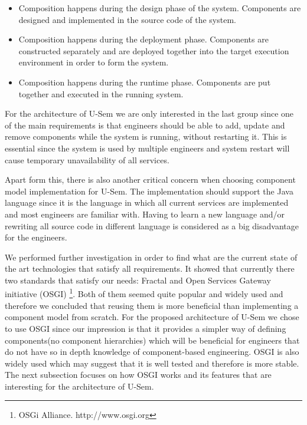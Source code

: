 \begin{itemize}
	\item  Composition happens during the design phase of the system. Components are designed and implemented in the source code of the system.
	\item  Composition happens during the deployment phase. Components are constructed separately and are deployed together into the target execution environment in order to form the system.
	\item Composition happens during the runtime phase. Components are put together and executed in the running system.
\end{itemize}

For the architecture of U-Sem we are only interested in the last group since one of the main requirements is that engineers should be able to add, update and remove components while the system is running, without restarting it. This is essential since the system is used by multiple engineers and system restart will cause temporary unavailability of all services. 

Apart form this, there is also another critical concern when choosing component model implementation for U-Sem. The implementation should support the Java language since it is the language in which all current services are implemented and most engineers are familiar with. Having to learn a new language and/or rewriting all source code in different language is considered as a big disadvantage for the engineers.

We performed further investigation in order to find what are the current state of the art technologies that satisfy all requirements. It showed that currently there two standards that satisfy our needs: Fractal \cite{bruneton2006fractal} and Open Services Gateway initiative (OSGI) \footnote{OSGi Alliance. http://www.osgi.org}. Both of them seemed quite popular and widely used and therefore we concluded that reusing them is more beneficial than implementing a component model from scratch. For the proposed architecture of U-Sem we chose to use OSGI since our impression is that it provides a simpler way of defining components(no component hierarchies) which will be beneficial for engineers that do not have so in depth knowledge of component-based engineering. OSGI is also widely used \cite{tavares2008gentle} which may suggest that it is well tested and therefore is more stable. The next subsection focuses on how OSGI works and its features that are interesting for the architecture of U-Sem.


